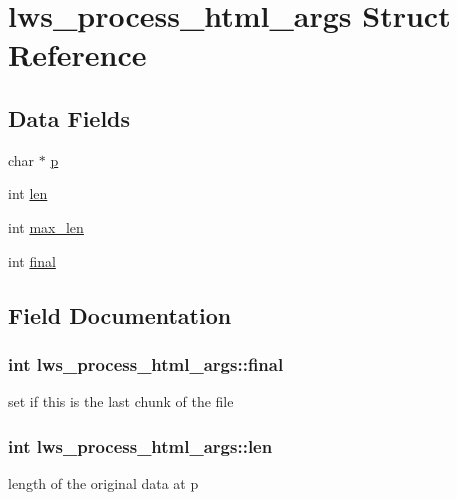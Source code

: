 \hypertarget{structlws__process__html__args}{}\section{lws\+\_\+process\+\_\+html\+\_\+args Struct Reference}
\label{structlws__process__html__args}
\subsection*{Data Fields}
\begin{DoxyCompactItemize}
\item 
char $\ast$ \hyperlink{structlws__process__html__args_a11859d8bedd379fbf64543b25c65fe14}{p}
\item 
int \hyperlink{structlws__process__html__args_a754513f2311241cabb0cd1c90d7307ef}{len}
\item 
int \hyperlink{structlws__process__html__args_a8be7fd396a1942ea2449a2fda990ff99}{max\+\_\+len}
\item 
int \hyperlink{structlws__process__html__args_a362547891ee0d693f3900a1f807ea475}{final}
\end{DoxyCompactItemize}


\subsection{Field Documentation}
\subsubsection[{\texorpdfstring{final}{final}}]{\setlength{\rightskip}{0pt plus 5cm}int lws\+\_\+process\+\_\+html\+\_\+args\+::final}\hypertarget{structlws__process__html__args_a362547891ee0d693f3900a1f807ea475}{}\label{structlws__process__html__args_a362547891ee0d693f3900a1f807ea475}
set if this is the last chunk of the file 
\subsubsection[{\texorpdfstring{len}{len}}]{\setlength{\rightskip}{0pt plus 5cm}int lws\+\_\+process\+\_\+html\+\_\+args\+::len}\hypertarget{structlws__process__html__args_a754513f2311241cabb0cd1c90d7307ef}{}\label{structlws__process__html__args_a754513f2311241cabb0cd1c90d7307ef}
length of the original data at p 
